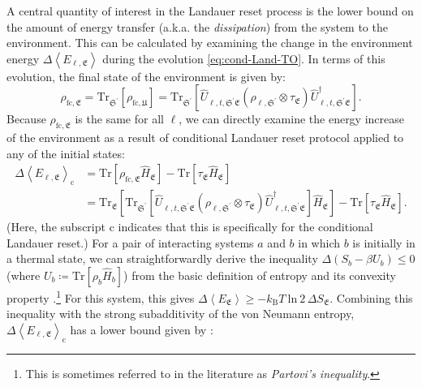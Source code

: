 \documentclass[preprints,article,accept,moreauthors,pdftex]{Definitions/mdpi}
\begin{document}
\begin{paracol}{2}
A central quantity of interest in the Landauer reset process is the lower bound on the amount of energy transfer (a.k.a. the \emph{dissipation}) from the system to the environment. This can be calculated by examining the change in the environment energy $\Delta\left\langle E_{\ell,\mathfrak{E}}\right\rangle$ during the evolution \eqref{eq:cond-Land-TO}. In terms of this evolution, the final state of the environment is given by:
\begin{equation}
    \label{eq:cond-Land-final-state-env}
    \rho_{\mathrm{f}\mathrm{c},\mathfrak{E}} = \mathrm{Tr}_{\mathfrak{S}^{\prime}} \left[\rho_{\mathrm{f}\mathrm{c},\mathfrak{U}}\right] = \mathrm{Tr}_{\mathfrak{S}^{\prime}} \left[ \widehat{U}_{\ell,t,\mathfrak{S^\prime E}} \left( \rho_{\ell,\mathfrak{S}^{\prime}} \otimes \tau_{\mathfrak{E}} \right) \widehat{U}_{\ell,t,\mathfrak{S^\prime E}}^{\dagger} \right].
\end{equation}
Because $\rho_{\mathrm{f}\mathrm{c},\mathfrak{E}}$ is the same for all $\ell$, we can directly examine the energy increase of the environment as a result of conditional Landauer reset protocol applied to any of the initial states:
\begin{equation}
    \label{eq:cond-Land-Delta-E}
    \begin{split}
        \Delta \left\langle E_{\ell,\mathfrak{E}}\right\rangle_{\mathrm{c}} &= \mathrm{Tr}\left[\rho_{\mathrm{f}\mathrm{c},\mathfrak{E}} \widehat{H}_{\mathfrak{E}} \right] - \mathrm{Tr}\left[\tau_{\mathfrak{E}} \widehat{H}_{\mathfrak{E}} \right]\\[4pt] 
        &= \mathrm{Tr}_{\mathfrak{E}}\left[\mathrm{Tr}_{\mathfrak{S}^{\prime}} \left[ \widehat{U}_{\ell,t,\mathfrak{S^\prime E}} \left( \rho_{\ell,\mathfrak{S}^{\prime}} \otimes \tau_{\mathfrak{E}} \right) \widehat{U}_{\ell,t,\mathfrak{S^\prime E}}^{\dagger} \right] \widehat{H}_{\mathfrak{E}} \right] - \mathrm{Tr}\left[\tau_{\mathfrak{E}} \widehat{H}_{\mathfrak{E}} \right].
    \end{split}
\end{equation}
(Here, the subscript $\mathrm{c}$ indicates that this is specifically for the conditional Landauer reset.) For a pair of interacting systems $a$ and $b$ in which $b$ is initially in a thermal state, we can straightforwardly derive the inequality $\Delta \left(S_{b} - \beta U_{b}\right) \leq 0$ (where $U_{b} \coloneqq \mathrm{Tr}\left[\rho_{b} \widehat{H}_{b}\right]$) from the basic definition of entropy and its convexity property \cite{Partovi89}.\footnote{This is sometimes referred to in the literature as \emph{Partovi's inequality}.} For this system, this gives $\Delta\left\langle E_{\mathfrak{E}} \right\rangle \geq -k_{\mathrm{B}}T\:\mathrm{ln}\:2\,\Delta S_{\mathfrak{E}}$. Combining this inequality with the strong subadditivity of the von Neumann entropy, $\Delta\left\langle E_{\ell,\mathfrak{E}}\right\rangle_{\mathrm{c}}$ has a lower bound given by \cite{Anderson19}:

\end{paracol}
\end{document}
